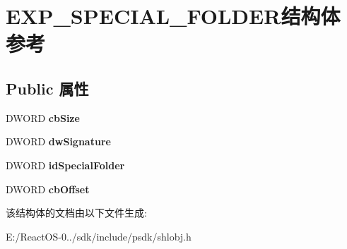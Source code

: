 \hypertarget{struct_e_x_p___s_p_e_c_i_a_l___f_o_l_d_e_r}{}\section{E\+X\+P\+\_\+\+S\+P\+E\+C\+I\+A\+L\+\_\+\+F\+O\+L\+D\+E\+R结构体 参考}
\label{struct_e_x_p___s_p_e_c_i_a_l___f_o_l_d_e_r}
\subsection*{Public 属性}
\begin{DoxyCompactItemize}
\item 
\mbox{\label{struct_e_x_p___s_p_e_c_i_a_l___f_o_l_d_e_r_a8529c0d0499e11b98638ed15281f115a}} 
D\+W\+O\+RD {\bfseries cb\+Size}
\item 
\mbox{\label{struct_e_x_p___s_p_e_c_i_a_l___f_o_l_d_e_r_a761e18ba063b8a2c17d5e2d54ec64f2c}} 
D\+W\+O\+RD {\bfseries dw\+Signature}
\item 
\mbox{\label{struct_e_x_p___s_p_e_c_i_a_l___f_o_l_d_e_r_a3a8f49eec32ee4e104d1f9ad24e4941d}} 
D\+W\+O\+RD {\bfseries id\+Special\+Folder}
\item 
\mbox{\label{struct_e_x_p___s_p_e_c_i_a_l___f_o_l_d_e_r_a5f3beda6099b947a993ba6d257b2173e}} 
D\+W\+O\+RD {\bfseries cb\+Offset}
\end{DoxyCompactItemize}


该结构体的文档由以下文件生成\+:\begin{DoxyCompactItemize}
\item 
E\+:/\+React\+O\+S-\/0../sdk/include/psdk/shlobj.\+h\end{DoxyCompactItemize}
